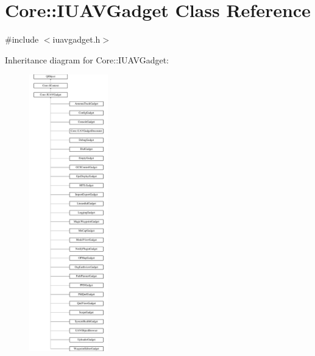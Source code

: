 \hypertarget{class_core_1_1_i_u_a_v_gadget}{\section{Core\-:\-:I\-U\-A\-V\-Gadget Class Reference}
\label{class_core_1_1_i_u_a_v_gadget}
}


{\ttfamily \#include $<$iuavgadget.\-h$>$}

Inheritance diagram for Core\-:\-:I\-U\-A\-V\-Gadget\-:\begin{figure}[H]
\begin{center}
\leavevmode
\includegraphics[height=12.000000cm]{class_core_1_1_i_u_a_v_gadget}
\end{center}
\end{figure}
